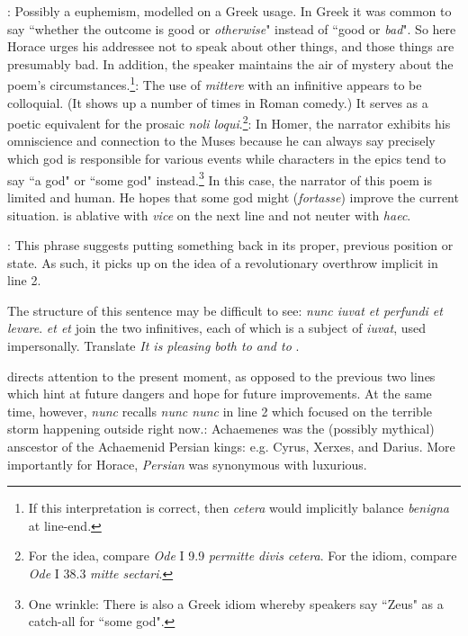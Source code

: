 
: Possibly a euphemism, modelled on a Greek usage.  In Greek it was common to say ``whether the outcome is good or \textit{otherwise}" instead of ``good or \textit{bad}".  So here Horace urges his addressee not to speak about other things, and those things are presumably bad.  In addition, the speaker maintains the air of mystery about the poem's circumstances.\footnote{If this interpretation is correct, then \textit{cetera} would implicitly balance \textit{benigna} at line-end.}\indent{}: The use of \textit{mittere} with an infinitive appears to be colloquial.  (It shows up a number of times in Roman comedy.)  It serves as a poetic equivalent for the prosaic \textit{noli loqui}.\footnote{For the idea, compare \textit{Ode} I 9.9 \textit{permitte divis cetera}. For the idiom, compare \textit{Ode} I 38.3 \textit{mitte sectari}.}\indent{}: In Homer, the narrator exhibits his omniscience and connection to the Muses because he can always say precisely which god is responsible for various events while characters in the epics tend to say ``a god" or ``some god" instead.\footnote{One wrinkle: There is also a Greek idiom whereby speakers say ``Zeus" as a catch-all for ``some god".} In this case, the narrator of this poem is limited and human.  He hopes that some god might (\textit{fortasse}) improve the current situation.\indent{} is ablative with \textit{vice} on the next line and not neuter with \textit{haec}.


: This phrase suggests putting something back in its proper, previous position or state.  As such, it picks up on the idea of a revolutionary overthrow implicit in line 2.


The structure of this sentence may be difficult to see: \textit{nunc iuvat et perfundi et levare}.  \textit{et \lips et} join the two infinitives, each of which is a subject of \textit{iuvat}, used impersonally.  Translate \textit{It is pleasing both to \lips and to \lips}.


 directs attention to the present moment, as opposed to the previous two lines which hint at future dangers and hope for future improvements.  At the same time, however, \textit{nunc} recalls \textit{nunc \lips nunc} in line 2 which focused on the terrible storm happening outside right now.\indent{}: Achaemenes was the (possibly mythical) anscestor of the Achaemenid Persian kings: e.g. Cyrus, Xerxes, and Darius.  More importantly for Horace, \textit{Persian} was synonymous with luxurious.

